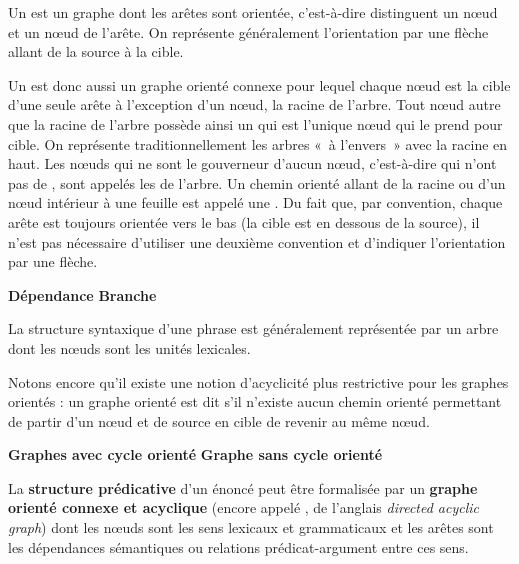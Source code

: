 {    Un  est un graphe dont les arêtes sont orientée, c’est-à-dire distinguent un nœud  et un nœud  de l’arête. On représente généralement l’orientation par une flèche allant de la source à la cible.

    Un  est donc aussi un graphe orienté connexe pour lequel chaque nœud est la cible d’une seule arête à l’exception d’un nœud, la racine de l’arbre. Tout nœud autre que la racine de l’arbre possède ainsi un  qui est l’unique nœud qui le prend pour cible. On représente traditionnellement les arbres «~à l’envers~» avec la racine en haut. Les nœuds qui ne sont le gouverneur d’aucun nœud, c’est-à-dire qui n’ont pas de , sont appelés les  de l’arbre. Un chemin orienté allant de la racine ou d’un nœud intérieur à une feuille est appelé une . Du fait que, par convention, chaque arête est toujours orientée vers le bas (la cible est en dessous de la source), il n’est pas nécessaire d’utiliser une deuxième convention et d’indiquer l’orientation par une flèche.



    \textbf{Dépendance}  \textbf{Branche}

    La structure syntaxique d’une phrase est généralement représentée par un arbre dont les nœuds sont les unités lexicales.

    Notons encore qu’il existe une notion d’acyclicité plus restrictive pour les graphes orientés : un graphe orienté est dit  s’il n’existe aucun chemin orienté permettant de partir d’un nœud et de source en cible de revenir au même nœud.



    \textbf{Graphes avec cycle orienté}  \textbf{Graphe sans cycle orienté}

    La \textbf{structure prédicative} d’un énoncé peut être formalisée par un \textbf{graphe orienté connexe et acyclique} (encore appelé , de l’anglais \textit{directed acyclic graph}) dont les nœuds sont les sens lexicaux et grammaticaux et les arêtes sont les dépendances sémantiques ou relations prédicat-argument entre ces sens.
}
